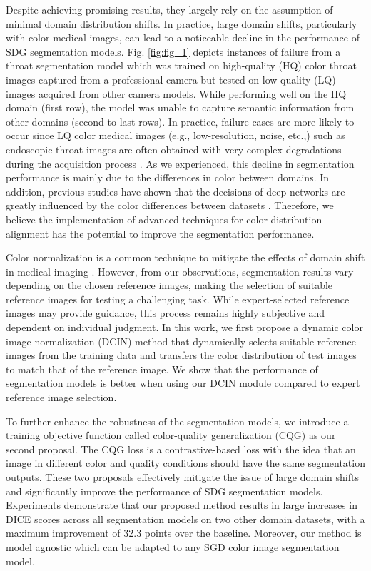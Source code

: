 Despite achieving promising results, they largely rely on the assumption of minimal domain distribution shifts. 
In practice, large domain shifts, particularly with color medical images, can lead to a noticeable decline in the performance of SDG segmentation models. 
Fig. \ref{fig:fig_1} depicts instances of failure from a throat segmentation model which was trained on high-quality (HQ) color throat images captured from a professional camera but tested on low-quality (LQ) images acquired from other camera models. 
While performing well on the HQ domain (first row), the model was unable to capture semantic information from other domains (second to last rows). 
In practice, failure cases are more likely to occur since LQ color medical images (e.g., low-resolution, noise, etc.,) such as endoscopic throat images are often obtained with very complex degradations during the acquisition process \cite{cap2025practical}. 
As we experienced, this decline in segmentation performance is mainly due to the differences in color between domains. In addition, previous studies have shown that the decisions of deep networks are greatly influenced by the color differences between datasets \cite{afifi2019else,de2021impact}. 
Therefore, we believe the implementation of advanced techniques for color distribution alignment has the potential to improve the segmentation performance. 

Color normalization is a common technique to mitigate the effects of domain shift in medical imaging \cite{macenko2009method, vahadane2016structure}. 
However, from our observations, segmentation results vary depending on the chosen reference images, making the selection of suitable reference images for testing a challenging task. 
While expert-selected reference images may provide guidance, this process remains highly subjective and dependent on individual judgment. 
In this work, we first propose a dynamic color image normalization (DCIN) method that dynamically selects suitable reference images from the training data and transfers the color distribution of test images to match that of the reference image. 
We show that the performance of segmentation models is better when using our DCIN module compared to expert reference image selection. 

To further enhance the robustness of the segmentation models, we introduce a training objective function called color-quality generalization (CQG) as our second proposal. 
The CQG loss is a contrastive-based loss with the idea that an image in different color and quality conditions should have the same segmentation outputs. 
These two proposals effectively mitigate the issue of large domain shifts and significantly improve the performance of SDG segmentation models. 
Experiments demonstrate that our proposed method results in large increases in DICE scores across all segmentation models on two other domain datasets, with a maximum improvement of 32.3 points over the baseline. 
Moreover, our method is model agnostic which can be adapted to any SGD color image segmentation model.  

